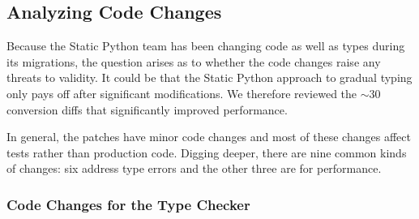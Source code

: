 \documentclass[english,cleveref,submission]{programming}
\newcommand{\SP}{Static Python}
\begin{document}


\subsection{Analyzing Code Changes}

Because the \SP{} team has been changing code as well as types during its
migrations, the question arises as to whether the code changes raise any
threats to validity.
It could be that the \SP{} approach to gradual typing only pays off
after significant modifications.
We therefore reviewed the $\sim 30$ conversion diffs that significantly improved
performance.

In general, the patches have minor code changes and most of these changes
affect tests rather than production code.
Digging deeper, there are nine common kinds of changes: six address
type errors and the other three are for performance.


\subsubsection{Code Changes for the Type Checker}

\end{document}
